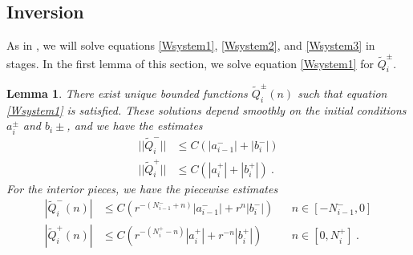 \documentclass[12pt]{elsarticle}
\newtheorem{lemma}{Lemma}
\begin{document}
\subsection{Inversion}

As in \cite{Sandstede1997}, we will solve equations \cref{Wsystem1}, \cref{Wsystem2}, and \cref{Wsystem3} in stages. In the first lemma of this section, we solve equation \cref{Wsystem1} for $\tilde{Q}_i^\pm$. 

\begin{lemma}\label{inv1}
There exist unique bounded functions $\tilde{Q}_i^\pm(n)$ such that equation \cref{Wsystem1} is satisfied. These solutions depend smoothly on the initial conditions $a_i^\pm$ and $b_i\pm$, and we have the estimates
\begin{equation}\label{Wipmest}
\begin{aligned}
||\tilde{Q}_i^-|| &\leq C (|a_{i-1}^-| + |b_i^-|) \\
||\tilde{Q}_i^+|| &\leq C (|a_i^+| + |b_i^+| ) \:.
\end{aligned}
\end{equation}
For the interior pieces, we have the piecewise estimates
\begin{equation}\label{Wipiecewise}
\begin{aligned}
|\tilde{Q}_i^-(n)| &\leq C (r^{-(N_{i-1}^- + n)}|a_{i-1}^-| + r^n|b_i^-|) && n \in [-N_{i-1}^-, 0] \\
|\tilde{Q}_i^+(n)| &\leq C (r^{-(N_i^+ - n)}|a_i^+| + r^{-n}|b_i^+| ) && n \in [0, N_i^+] \:.
\end{aligned}
\end{equation}


\end{lemma}
\end{document}
